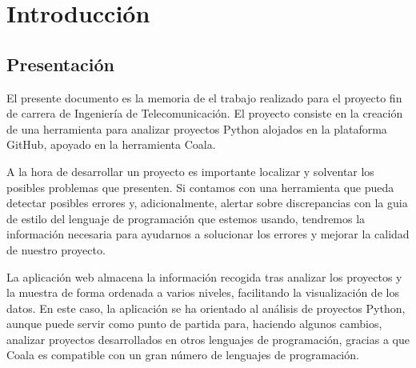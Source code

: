 \documentclass[a4paper, 12pt]{book}
\begin{document}
\tableofcontents 
\cleardoublepage
\listoffigures %



\cleardoublepage
\chapter{Introducción}
\label{sec:intro} %

\section{Presentación}
\label{sec:}
El presente documento es la memoria de el trabajo realizado para el proyecto fin de carrera de Ingeniería de Telecomunicación. El proyecto consiste en la creación de una herramienta para analizar proyectos Python alojados en la plataforma GitHub, apoyado en la herramienta Coala.

A la hora de desarrollar un proyecto es importante localizar y solventar los posibles problemas que presenten. Si contamos con una herramienta que pueda detectar posibles errores y, adicionalmente, alertar sobre discrepancias con la guia de estilo del lenguaje de programación que estemos usando, tendremos la información necesaria para ayudarnos a solucionar los errores y mejorar la calidad de nuestro proyecto.

La aplicación web almacena la información recogida tras analizar los proyectos y la muestra de forma ordenada a varios niveles, facilitando la visualización de los datos. En este caso, la aplicación se ha orientado al análisis de proyectos Python, aunque puede servir como punto de partida para, haciendo algunos cambios, analizar proyectos desarrollados en otros lenguajes de programación, gracias a que Coala es compatible con un gran número de lenguajes de programación.
\end{document}
